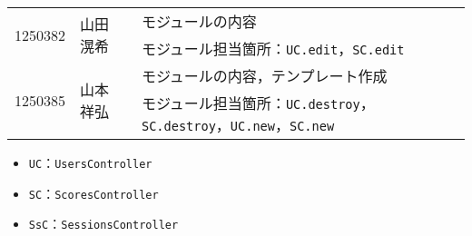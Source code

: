 \begin{table}[h]
\begin{tabularx}{\textwidth}{cll}
        \hline
        \multirow{2}{*}{1250382} & \multirow{2}{*}{山田 滉希} & モジュールの内容                                                                          \\
                                 &                        & モジュール担当箇所：\texttt{UC.edit}，\texttt{SC.edit}                                       \\
        \hline
        \multirow{2}{*}{1250385} & \multirow{2}{*}{山本 祥弘} & モジュールの内容，テンプレート作成                                                                 \\
                                 &                        & モジュール担当箇所：\texttt{UC.destroy}，\texttt{SC.destroy}，\texttt{UC.new}，\texttt{SC.new} \\
        \hline
    \end{tabularx}
\end{table}
\begin{itemize}
    \item \texttt{UC}：\texttt{UsersController}
    \item \texttt{SC}：\texttt{ScoresController}
    \item \texttt{SsC}：\texttt{SessionsController}
\end{itemize}